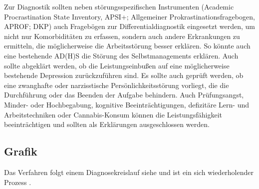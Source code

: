 Zur Diagnostik sollten neben störungsspezifischen Instrumenten (Academic Procrastination State Inventory, APSI+\cite{wiki}; Allgemeiner Prokrastinationsfragebogen, APROF;\cite{hoecker:2013} DKP\cite{hoecker:2013}) auch Fragebögen zur Differentialdiagnostik eingesetzt werden, um nicht nur Komorbiditäten zu erfassen, sondern auch andere Erkrankungen zu ermitteln, die möglicherweise die Arbeitsstörung besser erklären. So könnte auch eine bestehende AD(H)S die Störung des Selbstmanagements erklären. Auch sollte abgeklärt werden, ob die Leistungseinbußen auf eine möglicherweise bestehende Depression zurückzuführen sind. Es sollte auch geprüft werden, ob eine zwanghafte oder narzisstische Persönlichkeitsstörung vorliegt, die die Durchführung oder das Beenden der Aufgabe behindern. Auch Prüfungsangst, Minder- oder Hochbegabung, kognitive Beeinträchtigungen, defizitäre Lern- und Arbeitstechniken oder Cannabis-Konsum können die Leistungsfähigkeit beeinträchtigen und sollten als Erklärungen ausgeschlossen werden.

\subsection{Grafik}


Das Verfahren folgt einem Diagnosekreislauf siehe  und ist ein sich wiederholender Prozess . 